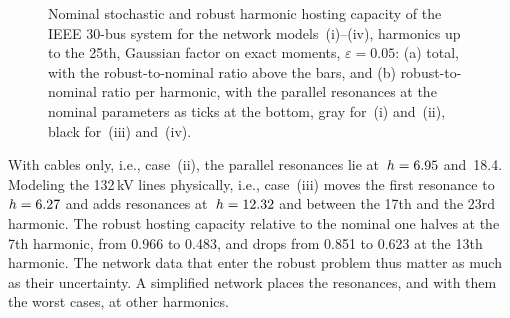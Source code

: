 \begin{figure}[!tb]
    \caption{Nominal stochastic and robust harmonic hosting capacity of the IEEE 30-bus system for the network models~(i)--(iv), harmonics up to the 25th, Gaussian factor on exact moments, $\varepsilon = 0.05$: (a) total, with the robust-to-nominal ratio above the bars, and (b) robust-to-nominal ratio per harmonic, with the parallel resonances at the nominal parameters as ticks at the bottom, gray for~(i) and~(ii), black for~(iii) and~(iv).}
    \label{fig:ieee30_physical}
\end{figure}

With cables only, i.e., case~(ii), the parallel resonances lie at~$h = 6.95$ and~18.4. Modeling the 132\,kV lines physically, i.e., case~(iii) moves the first resonance to~$h = 6.27$ and adds resonances at~$h = 12.32$ and between the 17th and the 23rd harmonic. The robust hosting capacity relative to the nominal one halves at the 7th harmonic, from 0.966 to 0.483, and drops from 0.851 to 0.623 at the 13th harmonic. The network data that enter the robust problem thus matter as much as their uncertainty. A simplified network places the resonances, and with them the worst cases, at other harmonics.

